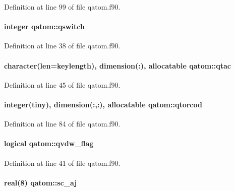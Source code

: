 Definition at line 99 of file qatom.\-f90.

\hypertarget{classqatom_a3e50342ab7867b2480379e7b998bc882}{
\paragraph[{qswitch}]{\setlength{\rightskip}{0pt plus 5cm}integer qatom\-::qswitch}}\label{classqatom_a3e50342ab7867b2480379e7b998bc882}


Definition at line 38 of file qatom.\-f90.

\hypertarget{classqatom_a6762a3f40177cdb6f7c42c0a4918b61c}{
\paragraph[{qtac}]{\setlength{\rightskip}{0pt plus 5cm}character(len=keylength), dimension(\-:), allocatable qatom\-::qtac}}\label{classqatom_a6762a3f40177cdb6f7c42c0a4918b61c}


Definition at line 45 of file qatom.\-f90.

\hypertarget{classqatom_a958c8fbc0b25411aa55098f9bc4755c2}{
\paragraph[{qtorcod}]{\setlength{\rightskip}{0pt plus 5cm}integer(tiny), dimension(\-:,\-:), allocatable qatom\-::qtorcod}}\label{classqatom_a958c8fbc0b25411aa55098f9bc4755c2}


Definition at line 84 of file qatom.\-f90.

\hypertarget{classqatom_ae27d6b6c13977933ac2f66796ae54de9}{
\paragraph[{qvdw\-\_\-flag}]{\setlength{\rightskip}{0pt plus 5cm}logical qatom\-::qvdw\-\_\-flag}}\label{classqatom_ae27d6b6c13977933ac2f66796ae54de9}


Definition at line 41 of file qatom.\-f90.

\hypertarget{classqatom_a4d79d466c4cb3aa0de5b1b066b07837f}{
\paragraph[{sc\-\_\-aj}]{\setlength{\rightskip}{0pt plus 5cm}real(8) qatom\-::sc\-\_\-aj}}\label{classqatom_a4d79d466c4cb3aa0de5b1b066b07837f}


